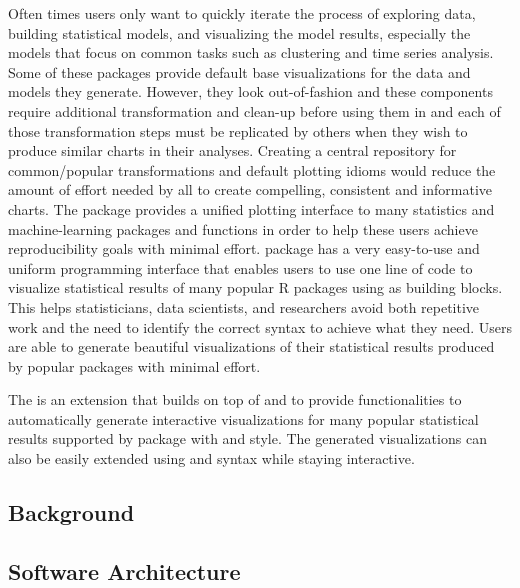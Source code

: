 Often times users only want to quickly iterate the process of exploring
data, building statistical models, and visualizing the model results,
especially the models that focus on common tasks such as clustering and
time series analysis. Some of these packages provide default base
 visualizations for the data and models they generate.
However, they look out-of-fashion and these components require
additional transformation and clean-up before using them in
 and each of those transformation steps must be replicated
by others when they wish to produce similar charts in their analyses.
Creating a central repository for common/popular transformations and
default plotting idioms would reduce the amount of effort needed by all
to create compelling, consistent and informative charts. The
 \citep{rjggfortify} package provides a unified
 plotting interface to many statistics and machine-learning
packages and functions in order to help these users achieve
reproducibility goals with minimal effort.  package has a
very easy-to-use and uniform programming interface that enables users to
use one line of code to visualize statistical results of many popular R
packages using  as building blocks. This helps
statisticians, data scientists, and researchers avoid both repetitive
work and the need to identify the correct  syntax to
achieve what they need. Users are able to generate beautiful
visualizations of their statistical results produced by popular packages
with minimal effort.

The  \citep{autoplotly} is an extension that builds
on top of  and  to provide functionalities
to automatically generate interactive visualizations for many popular
statistical results supported by  package with
 and  style. The generated visualizations can
also be easily extended using  and  syntax
while staying interactive.

\subsection{Background}\label{background}

\subsection{Software Architecture}\label{software-architecture}

